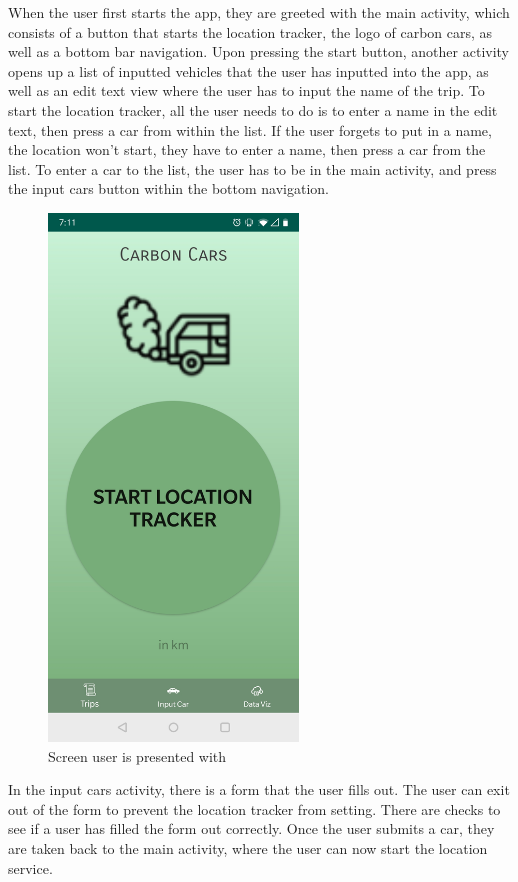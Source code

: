 \documentclass[twoside,twocolumn]{article}
\begin{document}
When the user first starts the app, they are greeted with the main activity, which consists of a button that starts the location tracker, the logo of carbon cars, as well as a bottom bar navigation. Upon pressing the start button, another activity opens up a list of inputted vehicles that the user has inputted into the app, as well as an edit text view where the user has to input the name of the trip. To start the location tracker, all the user needs to do is to enter a name in the edit text, then press a car from within the list. If the user forgets to put in a name, the location won't start, they have to enter a name, then press a car from the list. To enter a car to the list, the user has to be in the main activity, and press the input cars button within the bottom navigation.
\begin{figure}[h!]
  \includegraphics[width=\linewidth,height=14cm,keepaspectratio]{mainscreen.jpg}
  \caption{Screen user is presented with}
  \label{fig:screen}
\end{figure}


In the input cars activity, there is a form that the user fills out. The user can exit out of the form to prevent the location tracker from setting. There are checks to see if a user has filled the form out correctly. Once the user submits a car, they are taken back to the main activity, where the user can now start the location service.
\end{document}
